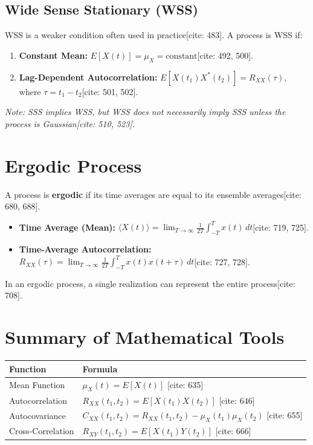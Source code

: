 \documentclass[11pt]{article}
\begin{document}
\subsection{Wide Sense Stationary (WSS)}
WSS is a weaker condition often used in practice[cite: 483]. A process is WSS if:
\begin{enumerate}
    \item \textbf{Constant Mean:} $E[X(t)] = \mu_X = \text{constant}$[cite: 492, 500].
    \item \textbf{Lag-Dependent Autocorrelation:} $E[X(t_1)X^*(t_2)] = R_{XX}(\tau)$, where $\tau = t_1 - t_2$[cite: 501, 502].
\end{enumerate}
\textit{Note: SSS implies WSS, but WSS does not necessarily imply SSS unless the process is Gaussian[cite: 510, 523].}

\section{Ergodic Process}
A process is \textbf{ergodic} if its time averages are equal to its ensemble averages[cite: 680, 688].
\begin{itemize}
    \item \textbf{Time Average (Mean):} $\langle X(t) \rangle = \lim_{T \to \infty} \frac{1}{2T} \int_{-T}^{T} x(t) \, dt$[cite: 719, 725].
    \item \textbf{Time-Average Autocorrelation:} $R_{XX}(\tau) = \lim_{T \to \infty} \frac{1}{2T} \int_{-T}^{T} x(t)x(t+\tau) \, dt$[cite: 727, 728].
\end{itemize}
In an ergodic process, a single realization can represent the entire process[cite: 708].

\section{Summary of Mathematical Tools}
\begin{table}[h]
\centering
\begin{tabular}{|l|l|}
\hline
\textbf{Function} & \textbf{Formula} \\ \hline
Mean Function & $\mu_X(t) = E[X(t)]$ [cite: 635] \\ \hline
Autocorrelation & $R_{XX}(t_1, t_2) = E[X(t_1)X(t_2)]$ [cite: 646] \\ \hline
Autocovariance & $C_{XX}(t_1, t_2) = R_{XX}(t_1, t_2) - \mu_X(t_1)\mu_X(t_2)$ [cite: 655] \\ \hline
Cross-Correlation & $R_{XY}(t_1, t_2) = E[X(t_1)Y(t_2)]$ [cite: 666] \\ \hline
\end{tabular}
\end{table}
\end{document}
